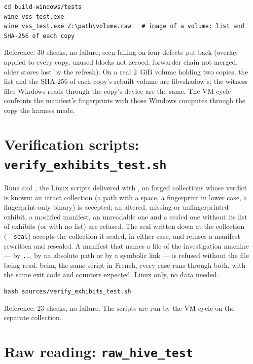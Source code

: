 \documentclass[11pt,a4paper,oneside]{report}
\begin{document}
\begin{lstlisting}
cd build-windows/tests
wine vss_test.exe
wine vss_test.exe Z:\path\volume.raw   # image of a volume: list and SHA-256 of each copy
\end{lstlisting}

Reference: 30 checks, no failure; seen failing on four defects put back
(overlay applied to every copy, unused blocks not zeroed, forwarder chain not
merged, older stores lost by the refresh). On a real 2~GiB volume holding two
copies, the list and the SHA-256 of each copy's rebuilt volume are
libvshadow's; the witness files Windows reads through the copy's device are the
same. The VM cycle confronts the manifest's fingerprints with those Windows
computes through the copy the harness made.

\section{Verification scripts: \texttt{verify\_exhibits\_test.sh}}

Runs  and , the
Linux scripts delivered with , on forged collections whose
verdict is known: an intact collection (a path with a space, a fingerprint in
lower case, a fingerprint-only binary) is accepted; an altered, missing or
unfingerprinted exhibit, a modified manifest, an unreadable one and a sealed
one without its list of exhibits (or with no list) are refused. The seal
written down at the collection (\texttt{-{}-seal}) accepts the collection it
sealed, in either case, and refuses a manifest rewritten and resealed.
A manifest that names a file of the investigation machine — by \texttt{..}, by
an absolute path or by a symbolic link — is refused without the file being
read.  being the same script in French, every
case runs through both, with the same exit code and counters expected. Linux only, no data
needed.

\begin{lstlisting}
bash sources/verify_exhibits_test.sh
\end{lstlisting}

Reference: 23 checks, no failure. The  scripts are run by the
VM cycle on the separate collection.

\section{Raw reading: \texttt{raw\_hive\_test}}
\end{document}
